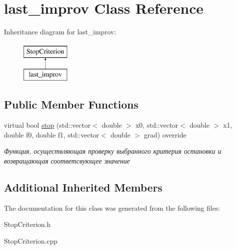 \hypertarget{classlast__improv}{}\section{last\+\_\+improv Class Reference}
\label{classlast__improv}
Inheritance diagram for last\+\_\+improv\+:\begin{figure}[H]
\begin{center}
\leavevmode
\includegraphics[height=2.000000cm]{classlast__improv}
\end{center}
\end{figure}
\subsection*{Public Member Functions}
\begin{DoxyCompactItemize}
\item 
\mbox{\label{classlast__improv_aed14fdf2a6a5c1638a012d9f58f114b7}} 
virtual bool \mbox{\hyperlink{classlast__improv_aed14fdf2a6a5c1638a012d9f58f114b7}{stop}} (std\+::vector$<$ double $>$ x0, std\+::vector$<$ double $>$ x1, double f0, double f1, std\+::vector$<$ double $>$ grad) override
\begin{DoxyCompactList}\small\item\em Функция, осуществляющая проверку выбранного критерия остановки и возвращающая соответсвующее значение \end{DoxyCompactList}\end{DoxyCompactItemize}
\subsection*{Additional Inherited Members}


The documentation for this class was generated from the following files\+:\begin{DoxyCompactItemize}
\item 
Stop\+Criterion.\+h\item 
Stop\+Criterion.\+cpp\end{DoxyCompactItemize}
